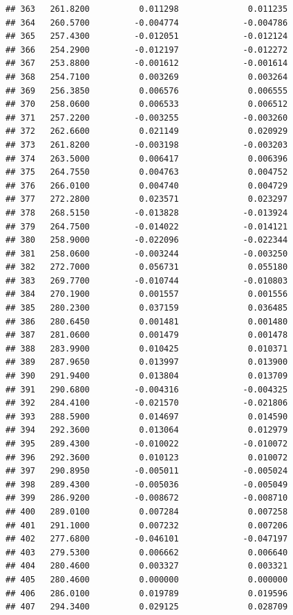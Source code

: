 \documentclass[
]{article}
\begin{document}
\begin{verbatim}
## 363   261.8200          0.011298              0.011235
## 364   260.5700         -0.004774             -0.004786
## 365   257.4300         -0.012051             -0.012124
## 366   254.2900         -0.012197             -0.012272
## 367   253.8800         -0.001612             -0.001614
## 368   254.7100          0.003269              0.003264
## 369   256.3850          0.006576              0.006555
## 370   258.0600          0.006533              0.006512
## 371   257.2200         -0.003255             -0.003260
## 372   262.6600          0.021149              0.020929
## 373   261.8200         -0.003198             -0.003203
## 374   263.5000          0.006417              0.006396
## 375   264.7550          0.004763              0.004752
## 376   266.0100          0.004740              0.004729
## 377   272.2800          0.023571              0.023297
## 378   268.5150         -0.013828             -0.013924
## 379   264.7500         -0.014022             -0.014121
## 380   258.9000         -0.022096             -0.022344
## 381   258.0600         -0.003244             -0.003250
## 382   272.7000          0.056731              0.055180
## 383   269.7700         -0.010744             -0.010803
## 384   270.1900          0.001557              0.001556
## 385   280.2300          0.037159              0.036485
## 386   280.6450          0.001481              0.001480
## 387   281.0600          0.001479              0.001478
## 388   283.9900          0.010425              0.010371
## 389   287.9650          0.013997              0.013900
## 390   291.9400          0.013804              0.013709
## 391   290.6800         -0.004316             -0.004325
## 392   284.4100         -0.021570             -0.021806
## 393   288.5900          0.014697              0.014590
## 394   292.3600          0.013064              0.012979
## 395   289.4300         -0.010022             -0.010072
## 396   292.3600          0.010123              0.010072
## 397   290.8950         -0.005011             -0.005024
## 398   289.4300         -0.005036             -0.005049
## 399   286.9200         -0.008672             -0.008710
## 400   289.0100          0.007284              0.007258
## 401   291.1000          0.007232              0.007206
## 402   277.6800         -0.046101             -0.047197
## 403   279.5300          0.006662              0.006640
## 404   280.4600          0.003327              0.003321
## 405   280.4600          0.000000              0.000000
## 406   286.0100          0.019789              0.019596
## 407   294.3400          0.029125              0.028709

\end{verbatim}
\end{document}
